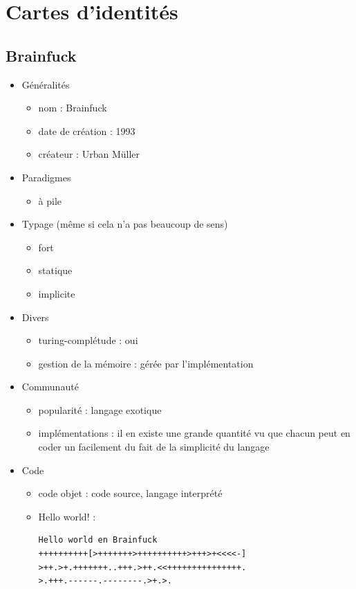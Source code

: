 \section{Cartes d'identités}

\subsection{Brainfuck}

\renewcommand{\labelitemi}{\textbullet}
\begin{itemize}
\item Généralités
	\begin{itemize}
	\item nom : Brainfuck
	\item date de création : 1993
	\item créateur : Urban Müller\\
	\end{itemize}
\item Paradigmes
	\begin{itemize}
	\item à pile\\
	\end{itemize}
\item Typage (même si cela n'a pas beaucoup de sens)
	\begin{itemize}
	\item fort
	\item statique
	\item implicite\\
	\end{itemize}
\item Divers
	\begin{itemize}
	\item turing-complétude : oui
	\item gestion de la mémoire : gérée par l'implémentation\\
	\end{itemize}
\item Communauté
	\begin{itemize}
	\item popularité : langage exotique
	\item implémentations : il en existe une grande quantité vu que chacun peut en coder un facilement du fait de la simplicité du langage\\
	\end{itemize}
\item Code
	\begin{itemize}
	\item code objet : code source, langage interprété
	\item Hello world! :
\begin{lstlisting}
Hello world en Brainfuck
++++++++++[>+++++++>++++++++++>+++>+<<<<-]
>++.>+.+++++++..+++.>++.<<+++++++++++++++.
>.+++.------.--------.>+.>.
\end{lstlisting}
	\end{itemize}
\end{itemize}

